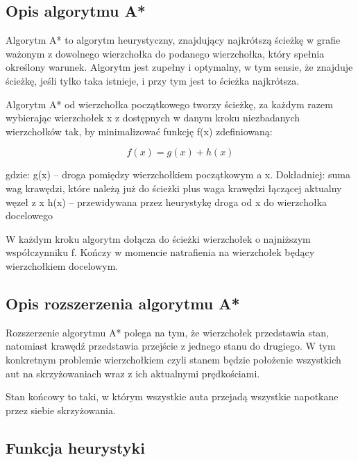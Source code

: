 \documentclass[../main.tex]{subfiles}
\begin{document}
 
\begin{figure}[bh]
\centering
 
\end{figure}

\subsection{Opis algorytmu A*}

Algorytm A* to algorytm heurystyczny, znajdujący najkrótszą ścieżkę w grafie ważonym z dowolnego wierzchołka do podanego wierzchołka, który spełnia określony warunek. Algorytm jest zupełny i optymalny, w tym sensie, że znajduje ścieżkę, jeśli tylko taka istnieje, i przy tym jest to ścieżka najkrótsza.


Algorytm A* od wierzchołka początkowego tworzy ścieżkę, za każdym razem wybierając wierzchołek x z dostępnych w danym kroku niezbadanych wierzchołków tak, by minimalizować funkcję f(x) zdefiniowaną:

\[ f(x) = g(x) + h(x) \]

gdzie:
\newline
\newline
g(x) – droga pomiędzy wierzchołkiem początkowym a x. Dokładniej: suma wag krawędzi, które należą już do ścieżki plus waga krawędzi łączącej aktualny węzeł z x
\newline
h(x) – przewidywana przez heurystykę droga od x do wierzchołka docelowego
\newline

W każdym kroku algorytm dołącza do ścieżki wierzchołek o najniższym współczynniku f. Kończy w momencie natrafienia na wierzchołek będący wierzchołkiem docelowym.

\subsection{Opis rozszerzenia algorytmu A*}

Rozszerzenie algorytmu A* polega na tym, że wierzchołek przedstawia stan, natomiast krawędź przedstawia przejście z jednego stanu do drugiego. W tym konkretnym problemie wierzchołkiem czyli stanem będzie położenie wszystkich aut na skrzyżowaniach wraz z ich aktualnymi prędkościami. 
\newline
\newline

Stan końcowy to taki, w którym wszystkie auta przejadą wszystkie napotkane przez siebie skrzyżowania.

\subsection{Funkcja heurystyki}
\end{document}
